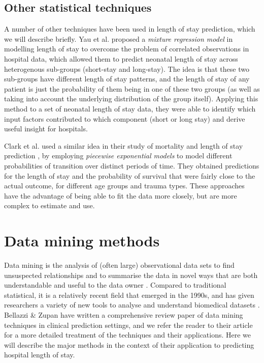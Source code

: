 \subsection{Other statistical techniques}
A number of other techniques have been used in length of stay prediction, which
we will describe briefly.
Yau et al. \citep{Yau2003} proposed a \textit{mixture regression model} in
modelling
length of stay to overcome the problem of correlated observations in hospital
data, which allowed them to predict neonatal length of stay across heterogenous
sub-groups (short-stay and long-stay). The idea is that these two sub-groups
have different length of stay patterns, and the length of stay of any patient
is just the probability of them being in one of these two groups (as well as
taking into account the underlying distribution of the group itself). Applying
this method to a set of neonatal length of stay data, they were able to
identify which input factors contributed to which component (short or long
stay) and derive useful insight for hospitals.

Clark et al. used a similar idea in their study of mortality and length of stay
prediction \citep{Clark2002}, by employing \textit{piecewise exponential models}
to model different probabilities of transition over distinct periods of time.
They obtained predictions for the length of stay and the probability of
survival that were fairly close to the actual outcome, for different age groups
and trauma types. These approaches have the advantage of being able to fit the
data more closely, but are more complex to estimate and use.

\section{Data mining methods}
Data mining is the analysis of (often large) observational data sets to find
unsuspected relationships and to summarise the data in novel ways that are both
understandable and useful to the data owner \citep{Hand2001}. Compared to
traditional statistical, it is a relatively recent field that emerged in the
1990s, and has
given researchers a variety of new tools to analyse and understand biomedical
datasets \citep{Bellazzi2008,Yoo2012}. Bellazzi \& Zupan \citep{Bellazzi2008}
have written a
comprehensive review paper of data mining techniques in clinical prediction
settings, and we refer the reader to their article for a more detailed
treatment of the techniques and their applications. Here we will describe the
major methods in the context of their application to predicting hospital length
of stay.


